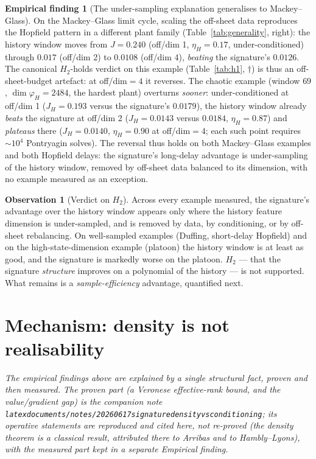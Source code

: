 \documentclass[11pt]{article}
\renewcommand{\_}{\discretionary{\textunderscore}{}{\textunderscore}}
\theoremstyle{plain}
\theoremstyle{definition}
\newtheorem{finding}[theorem]{Empirical finding}
\newtheorem{observation}[theorem]{Observation}
\begin{document}
\begin{finding}[The under-sampling explanation generalises to Mackey--Glass]\label{find:mg}
On the Mackey--Glass limit cycle, scaling the off-sheet data reproduces the Hopfield pattern in
a different plant family (Table~\ref{tab:generality}, right): the history window moves from
$J=0.240$ (off/dim 1, $\eta_H=0.17$, under-conditioned) through $0.017$ (off/dim 2) to
$\mathbf{0.0108}$ (off/dim 4), \emph{beating} the signature's $0.0126$. The canonical
$H_2$-holds verdict on this example (Table~\ref{tab:h1}, $\dagger$) is thus an off-sheet-budget
artefact: at off/dim${}=4$ it reverses. The chaotic example (window $69$, $\dim\varphi_H=2484$, the
hardest plant) overturns \emph{sooner}: under-conditioned at off/dim 1 ($J_H=0.193$ versus the
signature's $0.0179$), the history window already \emph{beats} the signature at off/dim 2
($J_H=0.0143$ versus $0.0184$, $\eta_H=0.87$) and \emph{plateaus} there
($J_H=0.0140$, $\eta_H=0.90$ at off/dim${}=4$; each such point requires $\sim10^{4}$ Pontryagin
solves). The reversal thus holds on both Mackey--Glass examples and both Hopfield delays: the
signature's long-delay advantage is under-sampling of the history window, removed by off-sheet
data balanced to its dimension, with no example measured as an exception.
\end{finding}

\begin{observation}[Verdict on $H_2$]\label{obs:h2}
Across every example measured, the signature's advantage over the history window appears only where
the history feature dimension is under-sampled, and is removed by data, by conditioning, or by
off-sheet rebalancing. On well-sampled examples (Duffing, short-delay Hopfield) and on the
high-state-dimension example (platoon) the history window is at least as good, and the signature is
markedly worse on the platoon. $H_2$ --- that the signature \emph{structure} improves on a
polynomial of the history --- is not supported. What remains is a \emph{sample-efficiency}
advantage, quantified next.
\end{observation}

\section{Mechanism: density is not realisability}\label{sec:mechanism}

\emph{The empirical findings above are explained by a single structural fact, proven and then
measured. The proven part (a Veronese effective-rank bound, and the value/gradient gap) is the
companion note
\texttt{latex\_documents/notes/2026\_06\_17\_signature\_density\_vs\_conditioning}; its operative
statements are reproduced and cited here, not re-proved (the density theorem is a classical result,
attributed there to Arribas and to Hambly--Lyons), with the measured part kept in a separate
\textnormal{Empirical finding}.}
\end{document}
